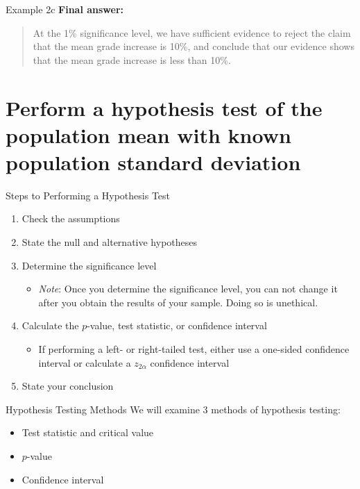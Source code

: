 \documentclass[t]{beamer}
\begin{document}
\begin{frame}{Example 2c}
\textbf{Final answer:}
\begin{quote}
At the 1\% significance level, we have sufficient evidence to reject the claim that the mean grade increase is 10\%, and conclude that our evidence shows that the mean grade increase is less than 10\%.
\end{quote}
\end{frame}

\section{Perform a hypothesis test of the population mean with known population standard deviation}

\begin{frame}{Steps to Performing a Hypothesis Test}
\begin{enumerate}
	\item Check the assumptions
	\item<2-> State the null and alternative hypotheses
	\item<3-> Determine the significance level
	\begin{itemize}
	\item<3-> \emph{Note}: Once you determine the significance level, you can not change it after you obtain the results of your sample. Doing so is unethical.
	\end{itemize}
	\item<4-> Calculate the $p$-value, test statistic, or confidence interval
	\begin{itemize}
	\item<5-> If performing a left- or right-tailed test, either use a one-sided confidence interval or calculate a $z_{2\alpha}$ confidence interval
	\end{itemize}
	\item<6-> State your conclusion
\end{enumerate}
\end{frame}

\begin{frame}{Hypothesis Testing Methods}
We will examine 3 methods of hypothesis testing:	\newline\\
\begin{itemize}
	\item<2-> Test statistic and critical value
	\item<3-> $p$-value
	\item<4-> Confidence interval
\end{itemize}
\end{frame}
\end{document}
